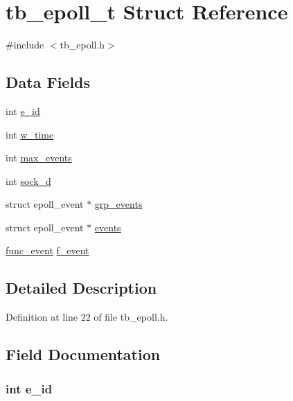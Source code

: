 \hypertarget{structtb__epoll__t}{\section{tb\-\_\-epoll\-\_\-t Struct Reference}
\label{structtb__epoll__t}
}


{\ttfamily \#include $<$tb\-\_\-epoll.\-h$>$}

\subsection*{Data Fields}
\begin{DoxyCompactItemize}
\item 
int \hyperlink{structtb__epoll__t_ae2ab59af76be940892170990721a0832}{e\-\_\-id}
\item 
int \hyperlink{structtb__epoll__t_a19a7826f48a7614bfecc19d92180bdf2}{w\-\_\-time}
\item 
int \hyperlink{structtb__epoll__t_af33c7ec0520688c34f813b2ef1e2a8a8}{max\-\_\-events}
\item 
int \hyperlink{structtb__epoll__t_a94d540b145f21be2f9b28a2c225ccf30}{sock\-\_\-d}
\item 
struct epoll\-\_\-event $\ast$ \hyperlink{structtb__epoll__t_aac2af089be9cb8e9bf9c5d5810efc7dc}{grp\-\_\-events}
\item 
struct epoll\-\_\-event $\ast$ \hyperlink{structtb__epoll__t_a18bcd14e4d4cab5184d3b046754cd248}{events}
\item 
\hyperlink{tb__epoll_8h_ab908abbc4a276702f09c05bdf565bd64}{func\-\_\-event} \hyperlink{structtb__epoll__t_a9b459c4abc5f43de26364e0923fcfbdf}{f\-\_\-event}
\end{DoxyCompactItemize}


\subsection{Detailed Description}


Definition at line 22 of file tb\-\_\-epoll.\-h.



\subsection{Field Documentation}
\hypertarget{structtb__epoll__t_ae2ab59af76be940892170990721a0832}{
\subsubsection[{e\-\_\-id}]{\setlength{\rightskip}{0pt plus 5cm}int e\-\_\-id}}\label{structtb__epoll__t_ae2ab59af76be940892170990721a0832}



